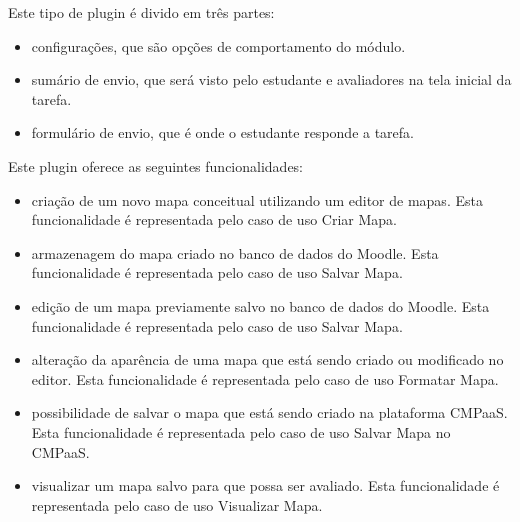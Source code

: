 \documentclass[
	12pt,				%
	openright,			%
	oneside,			%
	a4paper,			%
	english,			%
	french,				%
	spanish,			%
	brazil				%
	]{abntex2}
\begin{document}
Este tipo de plugin é divido em três partes:
\begin{itemize}
	\item configurações, que são opções de comportamento do módulo.
	\item sumário de envio, que será visto pelo estudante e avaliadores na tela inicial da tarefa.
	\item formulário de envio, que é onde o estudante responde a tarefa.  
\end{itemize} 

%
Este plugin oferece as seguintes funcionalidades:

\begin{itemize}
	\item criação de um novo mapa conceitual utilizando um editor de mapas. Esta funcionalidade é representada pelo caso de uso Criar Mapa.
	\item armazenagem do mapa criado no banco de dados do Moodle. Esta funcionalidade é representada pelo caso de uso Salvar Mapa.
	\item edição de um mapa previamente salvo no banco de dados do Moodle. Esta funcionalidade é representada pelo caso de uso Salvar Mapa.
	\item alteração da aparência de uma mapa que está sendo criado ou modificado no editor. Esta funcionalidade é representada pelo caso de uso Formatar Mapa.  
	\item possibilidade de salvar o mapa que está sendo criado na plataforma CMPaaS. Esta funcionalidade é representada pelo caso de uso Salvar Mapa no CMPaaS.  
	\item visualizar um mapa salvo para que possa ser avaliado. Esta funcionalidade é representada pelo caso de uso Visualizar Mapa.    
\end{itemize} 
\end{document}
